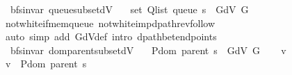 \begin{isabellebody}
\isadelimdocument
%
\endisadelimdocument
%
\isatagdocument
%
\isamarkuptrue%
%
\endisatagdocument
{\isafolddocument}%
%
\isadelimdocument
%
\endisadelimdocument
{}\isamarkupfalse%
\ {\isacharparenleft}{\kern0pt}\ bfs{\isacharunderscore}{\kern0pt}invar{\isacharparenright}{\kern0pt}\ queue{\isacharunderscore}{\kern0pt}subset{\isacharunderscore}{\kern0pt}dV{\isacharcolon}{\kern0pt}\isanewline
\ \ \ {\isachardoublequoteopen}set\ {\isacharparenleft}{\kern0pt}Q{\isacharunderscore}{\kern0pt}list\ {\isacharparenleft}{\kern0pt}queue\ s{\isacharparenright}{\kern0pt}{\isacharparenright}{\kern0pt}\ {\isasymsubseteq}\ G{\isachardot}{\kern0pt}dV\ G{\isachardoublequoteclose}\isanewline
%
\isadelimproof
\ \ %
\endisadelimproof
%
\isatagproof
{}\isamarkupfalse%
\ not{\isacharunderscore}{\kern0pt}white{\isacharunderscore}{\kern0pt}if{\isacharunderscore}{\kern0pt}mem{\isacharunderscore}{\kern0pt}queue\ not{\isacharunderscore}{\kern0pt}white{\isacharunderscore}{\kern0pt}imp{\isacharunderscore}{\kern0pt}dpath{\isacharunderscore}{\kern0pt}rev{\isacharunderscore}{\kern0pt}follow\isanewline
\ \ \isamarkupfalse%
\ {\isacharparenleft}{\kern0pt}auto\ simp\ add{\isacharcolon}{\kern0pt}\ G{\isachardot}{\kern0pt}dV{\isacharunderscore}{\kern0pt}def\ intro{\isacharcolon}{\kern0pt}\ dpath{\isacharunderscore}{\kern0pt}bet{\isacharunderscore}{\kern0pt}endpoints{\isacharparenleft}{\kern0pt}{}{\isacharparenright}{\kern0pt}{\isacharparenright}{\kern0pt}%
\endisatagproof
{\isafoldproof}%
%
\isadelimproof
\isanewline
%
\endisadelimproof
\isanewline
{}\isamarkupfalse%
\ {\isacharparenleft}{\kern0pt}\ bfs{\isacharunderscore}{\kern0pt}invar{\isacharparenright}{\kern0pt}\ dom{\isacharunderscore}{\kern0pt}parent{\isacharunderscore}{\kern0pt}subset{\isacharunderscore}{\kern0pt}dV{\isacharcolon}{\kern0pt}\isanewline
\ \ \ {\isachardoublequoteopen}P{\isachardot}{\kern0pt}dom\ {\isacharparenleft}{\kern0pt}parent\ s{\isacharparenright}{\kern0pt}\ {\isasymsubseteq}\ G{\isachardot}{\kern0pt}dV\ G{\isachardoublequoteclose}\isanewline
%
\isadelimproof
%
\endisadelimproof
%
\isatagproof
{}\isamarkupfalse%
\isanewline
\ \ \isamarkupfalse%
\ v\isanewline
\ \ \isamarkupfalse%
\ {\isachardoublequoteopen}v\ {\isasymin}\ P{\isachardot}{\kern0pt}dom\ {\isacharparenleft}{\kern0pt}parent\ s{\isacharparenright}{\kern0pt}{\isachardoublequoteclose}\isanewline
\ \ \isamarkupfalse%

\end{isabellebody}
